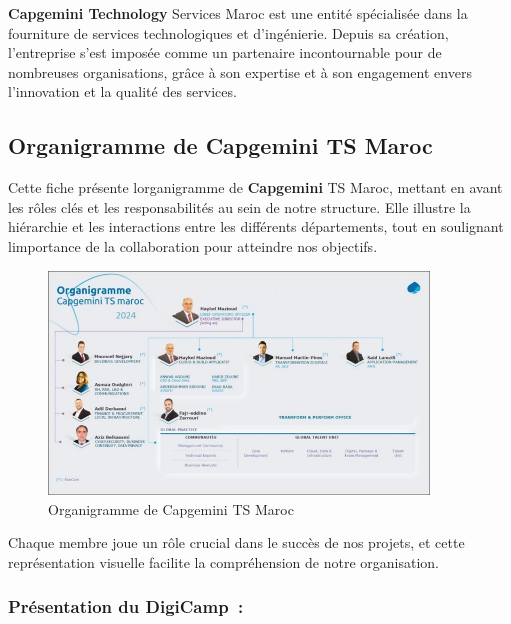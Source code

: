 \documentclass[12pt,a4paper,twoside,openright]{report}
\begin{document}
\textbf{Capgemini Technology} Services Maroc est une entité spécialisée dans la fourniture de services technologiques et d'ingénierie. Depuis sa création, l'entreprise s'est imposée comme un partenaire incontournable pour de nombreuses organisations, grâce à son expertise et à son engagement envers l'innovation et la qualité des services.

\hypertarget{organigramme-de-capgemini-ts-maroc}{%
\subsection{Organigramme de Capgemini TS
Maroc}\label{organigramme-de-capgemini-ts-maroc}}

Cette fiche présente l\textquotesingle organigramme de
\textbf{Capgemini} TS Maroc, mettant en avant les rôles clés et les
responsabilités au sein de notre structure. Elle illustre la hiérarchie
et les interactions entre les différents départements, tout en
soulignant l\textquotesingle importance de la collaboration pour
atteindre nos objectifs.

\begin{figure}[htbp]
    \centering
    \includegraphics[width=0.9\textwidth]{latex_media/media/image5.jpeg}
    \caption{Organigramme de Capgemini TS Maroc}
    \label{fig:organigramme-capgemini}
\end{figure}

Chaque membre joue un rôle crucial dans le succès de nos projets, et cette représentation visuelle facilite la compréhension de notre organisation.

\hypertarget{pruxe9sentation-du-digicamp}{%
\subsubsection{Présentation du
DigiCamp~:}\label{pruxe9sentation-du-digicamp}}
\end{document}
